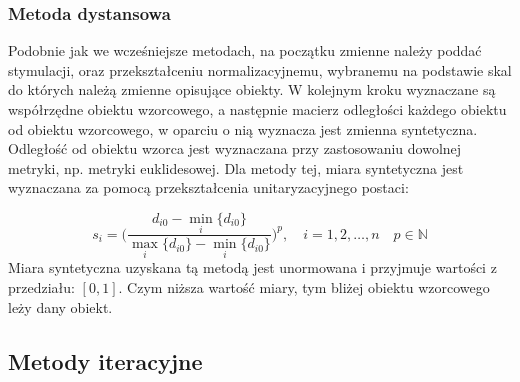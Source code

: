 \documentclass[12pt,a4paper]{report}
\begin{document}
%

\subsubsection{Metoda dystansowa}


Podobnie jak we wcześniejsze metodach, na początku zmienne należy poddać stymulacji, oraz przekształceniu normalizacyjnemu, wybranemu na podstawie skal do których należą zmienne opisujące obiekty. W kolejnym kroku wyznaczane są współrzędne obiektu wzorcowego, a następnie macierz odległości każdego obiektu od obiektu wzorcowego, w oparciu o nią wyznacza jest zmienna syntetyczna. Odległość od obiektu wzorca jest wyznaczana przy zastosowaniu dowolnej metryki, np. metryki euklidesowej. %
Dla metody tej, miara syntetyczna jest wyznaczana za pomocą przekształcenia unitaryzacyjnego postaci: 

$$s_{i}=\bigg(\frac{d_{i0}-\min\limits_{i}\{d_{i0}\}}{\max\limits_{i}\{d_{i0}\}-\min\limits_{i}\{d_{i0}\}} \bigg)^{p}, \quad i=1,2,\dots,n \quad p \in \mathbb{N}
$$
Miara syntetyczna uzyskana tą metodą jest unormowana i przyjmuje wartości z przedziału: $[0,1]$. Czym niższa wartość miary, tym bliżej obiektu wzorcowego leży dany obiekt. 

\subsection{Metody iteracyjne}
\end{document}
